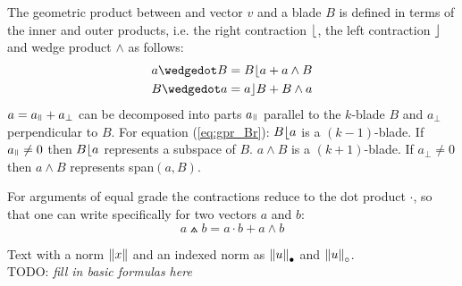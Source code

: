 The geometric product between and vector $v$ and a blade $B$ is defined in terms of
the inner and outer products, i.e. the right contraction $\lfloor$, the left contraction
$\rfloor$ and wedge product $\wedge$ as follows:
\begin{subequations}
    \begin{align}
    a \wedgedot B & =  B \rcontr a + a \wedge B
    \label{eq:gpr_Br} \\
    B \wedgedot a & =  a \lcontr B + B \wedge a 
    \label{eq:gpr_Bl}
    \end{align}
\end{subequations}
$a = a_{\parall} + a_{\perp}$ can be decomposed into parts $a_{\parall}$ parallel to the
$k$-blade $B$ and $a_{\perp}$ perpendicular to $B$. For equation {(\ref{eq:gpr_Br})}: $B
\lfloor a$ is a $(k-1)$-blade. If $a_{\parall} \neq 0$ then $B \lfloor a$ represents a
subspace of $B$. $a \wedge B$ is a $(k+1)$-blade. If $a_{\perp} \neq 0$ then $a \wedge B$
represents span$(a,B)$.

For arguments of equal grade the contractions reduce to the dot
product $\cdot$, so that one can write specifically for two vectors $a$ and $b$:
\begin{equation}
    a \wedgedot b =  a \cdot b + a \wedge b
\end{equation}

Text with a norm $\left \lVert {x} \right \rVert$ and an indexed norm as ${\left \lVert {u} \right \rVert}_\bullet$ and
${\left \lVert {u} \right \rVert}_\circ$.\\


TODO: \emph{fill in basic formulas here}

\newpage